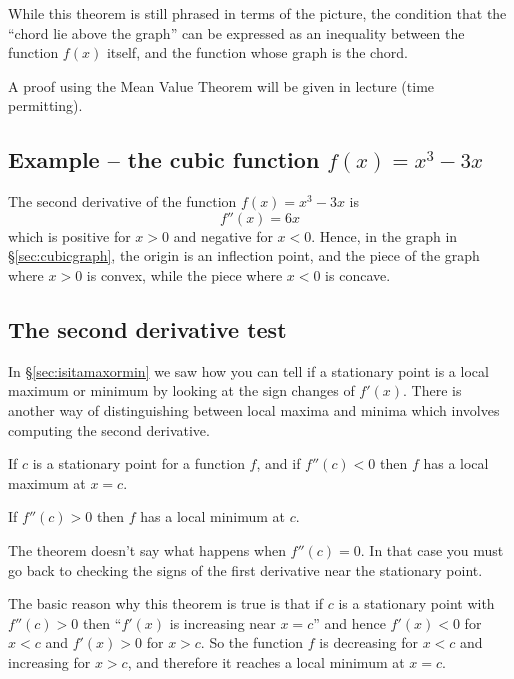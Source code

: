While this theorem is still phrased in terms of the picture, the condition that
the ``chord lie above the graph'' can be expressed as an inequality between the
function $f(x)$ itself, and the function whose graph is the chord.  

A proof using the Mean Value Theorem will be given in lecture (time permitting).

\subsection{Example -- the cubic function $f(x) = x^3-3x$}
\label{sec:convexpartofcubic}%
The second derivative of the function $f(x) = x^3-3x$ is
\[
f''(x) = 6x
\]
which is positive for $x>0$ and negative for $x<0$. Hence, in the graph in
\S\ref{sec:cubicgraph}, the origin is an inflection point, and the piece of the
graph where $x>0$ is convex, while the piece where $x<0$ is concave.


\subsection{The second derivative test}
In \S\ref{sec:isitamaxormin} we saw how you can tell if a stationary point is a
local maximum or minimum by looking at the sign changes of $f'(x)$.  There is
another way of distinguishing between local maxima and minima which involves
computing the second derivative.
\begin{theorem}
  If $c$ is a stationary point for a function $f$, and if $f''(c)<0$ then $f$
  has a local maximum at $x=c$.

  If $f''(c)>0$ then $f$ has a local minimum at $c$.
\end{theorem}\smallskip

The theorem doesn't say what happens when $f''(c) = 0$.  In that case you must
go back to checking the signs of the first derivative near the stationary point.

The basic reason why this theorem is true is that if $c$ is a stationary point
with $f''(c)>0$ then ``$f'(x)$ is increasing near $x=c$'' and hence $f'(x)<0$
for $x<c$ and $f'(x)>0$ for $x>c$.  So the function $f$ is decreasing for $x<c$
and increasing for $x>c$, and therefore it reaches a local minimum at $x=c$.
\marginpar{\sffamily\itshape\footnotesize%
   \\
   }

